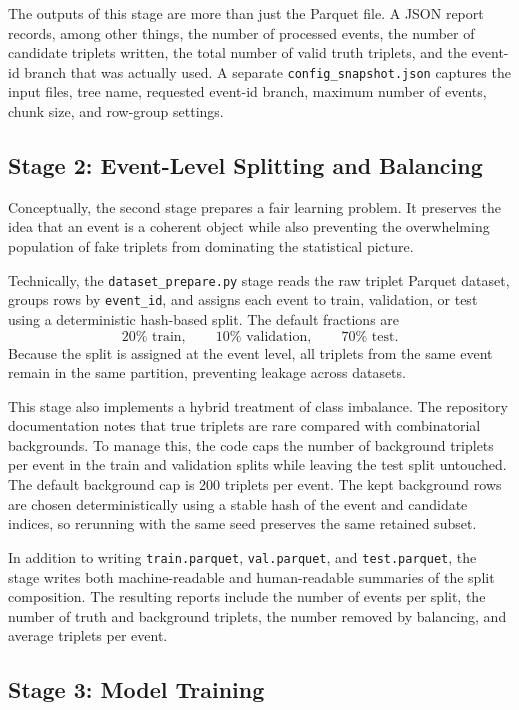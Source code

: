 \documentclass[11pt]{article}
\begin{document}
The outputs of this stage are more than just the Parquet file. A JSON report records, among other things, the number of processed events, the number of candidate triplets written, the total number of valid truth triplets, and the event-id branch that was actually used. A separate \texttt{config\_snapshot.json} captures the input files, tree name, requested event-id branch, maximum number of events, chunk size, and row-group settings.

\subsection{Stage 2: Event-Level Splitting and Balancing}

Conceptually, the second stage prepares a fair learning problem. It preserves the idea that an event is a coherent object while also preventing the overwhelming population of fake triplets from dominating the statistical picture.

Technically, the \texttt{dataset\_prepare.py} stage reads the raw triplet Parquet dataset, groups rows by \texttt{event\_id}, and assigns each event to train, validation, or test using a deterministic hash-based split. The default fractions are
\[
20\% \text{ train}, \qquad 10\% \text{ validation}, \qquad 70\% \text{ test}.
\]
Because the split is assigned at the event level, all triplets from the same event remain in the same partition, preventing leakage across datasets.

This stage also implements a hybrid treatment of class imbalance. The repository documentation notes that true triplets are rare compared with combinatorial backgrounds. To manage this, the code caps the number of background triplets per event in the train and validation splits while leaving the test split untouched. The default background cap is 200 triplets per event. The kept background rows are chosen deterministically using a stable hash of the event and candidate indices, so rerunning with the same seed preserves the same retained subset.

In addition to writing \texttt{train.parquet}, \texttt{val.parquet}, and \texttt{test.parquet}, the stage writes both machine-readable and human-readable summaries of the split composition. The resulting reports include the number of events per split, the number of truth and background triplets, the number removed by balancing, and average triplets per event.

\subsection{Stage 3: Model Training}
\end{document}
